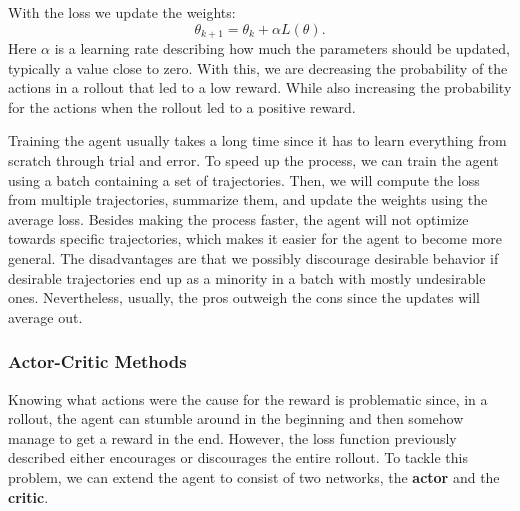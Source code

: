 \documentclass[12pt,A4]{report}
\theoremstyle{definition}
\begin{document}
With the loss we update the weights:
\[ \theta_{k+1} = \theta_k + \alpha L(\theta).\]
Here $\alpha$ is a learning rate describing how much the parameters should be updated, typically a value close to zero. With this, we are decreasing the probability of the actions in a rollout that led to a low reward. While also increasing the probability for the actions when the rollout led to a positive reward.


Training the agent usually takes a long time since it has to learn everything from scratch through trial and error. To speed up the process, we can train the agent using a batch containing a set of trajectories. Then, we will compute the loss from multiple trajectories, summarize them, and update the weights using the average loss. Besides making the process faster, the agent will not optimize towards specific trajectories, which makes it easier for the agent to become more general. The disadvantages are that we possibly discourage desirable behavior if desirable trajectories end up as a minority in a batch with mostly undesirable ones. Nevertheless, usually, the pros outweigh the cons since the updates will average out.


\subsubsection{Actor-Critic Methods}
Knowing what actions were the cause for the reward is problematic since, in a rollout, the agent can stumble around in the beginning and then somehow manage to get a reward in the end. However, the loss function previously described either encourages or discourages the entire rollout. To tackle this problem, we can extend the agent to consist of two networks, the \textbf{actor} and the \textbf{critic}. 
\end{document}
